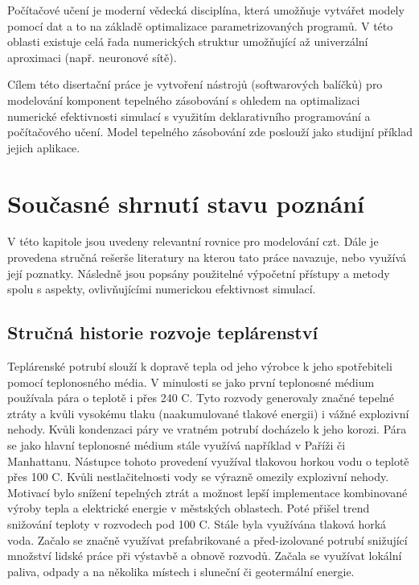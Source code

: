 Počítačové učení je moderní vědecká disciplína, která umožňuje vytvářet modely
pomocí dat a to na základě optimalizace parametrizovaných programů. V této
oblasti existuje celá řada numerických struktur umožňující až univerzální
aproximaci (např. neuronové sítě).

Cílem této disertační práce je vytvoření nástrojů (softwarových balíčků) pro
modelování komponent tepelného zásobování s ohledem na optimalizaci numerické
efektivnosti simulací s využitím deklarativního programování a počítačového
učení. Model tepelného zásobování zde poslouží jako studijní příklad jejich
aplikace.

\chapter{Současné shrnutí stavu poznání}
\label{struktura}
V této kapitole jsou uvedeny relevantní rovnice pro modelování \acrshort{czt}. Dále je
provedena stručná rešerše literatury na kterou tato práce navazuje, nebo
využívá její poznatky. Následně jsou popsány použitelné výpočetní přístupy
a metody spolu s aspekty, ovlivňujícími numerickou efektivnost simulací.

\section{Stručná historie rozvoje teplárenství}
\label{sec:history}
Teplárenské potrubí slouží k dopravě tepla od jeho výrobce k jeho spotřebiteli
pomocí teplonosného média. V minulosti se jako první teplonosné médium
používala pára o teplotě i přes 240 \degree C. Tyto rozvody generovaly značné
tepelné ztráty a kvůli vysokému tlaku (naakumulované tlakové energii) i vážné
explozivní nehody. Kvůli kondenzaci páry ve vratném potrubí docházelo k jeho
korozi. Pára se jako hlavní teplonosné médium stále využívá například v Paříži
či Manhattanu. Nástupce tohoto provedení využíval tlakovou horkou vodu o
teplotě přes 100 \degree C. Kvůli nestlačitelnosti vody se výrazně omezily
explozivní nehody.
Motivací bylo snížení tepelných ztrát a možnost lepší implementace kombinované
výroby tepla a elektrické energie v městských oblastech. Poté přišel trend
snižování teploty v rozvodech pod 100 \degree C. Stále byla využívána tlaková
horká voda. Začalo se značně využívat prefabrikované a před-izolované potrubí
snižující množství lidské práce při výstavbě a obnově rozvodů. Začala se
využívat lokální paliva, odpady a na několika místech i sluneční či geotermální
energie.


